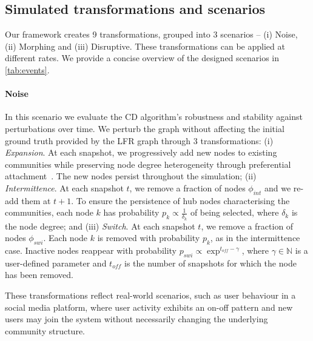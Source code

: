 \documentclass[letterpaper]{article}
\begin{document}
\subsection{Simulated transformations and scenarios}
\label{ss:scenarios}
Our framework creates 9 transformations, grouped into
 3 scenarios -- \ie (i) Noise, (ii) Morphing and (iii) Disruptive. These transformations can be applied at different rates. We provide a concise overview of the designed scenarios in \cref{tab:events}.

\paragraph*{Noise} In this scenario we evaluate the CD algorithm's robustness and stability against perturbations over time.
We perturb the graph without affecting the initial ground truth provided by the LFR graph through 3 transformations: (i) \emph{Expansion}. At each snapshot, we progressively add new nodes to existing communities while preserving node degree heterogeneity through preferential attachment~\cite{Baraba_si_1999}. The new nodes persist throughout the simulation; (ii) \emph{Intermittence}.
At each snapshot $t$, we remove a fraction of nodes $\phi_{int}$ and we re-add them at $t+1$. To ensure the persistence of hub nodes characterising the communities, each node $k$ has probability $p_{k} \propto \frac{1}{\delta_k}$ of being selected, where $\delta_k$ is the node degree; and (iii) \emph{Switch}. At each snapshot $t$, we remove a fraction of nodes $\phi_{swi}$. Each node $k$ is removed with probability $p_{k}$, as in the intermittence case. Inactive nodes reappear with probability $p_{swi} \propto \exp^{t_{off} -\gamma }$, where $\gamma \in \mathbb{N}$ is a user-defined parameter and $t_{off}$ is the number of snapshots for which the node has been removed.

These transformations reflect real-world scenarios, such as user behaviour in a social media platform, where user activity exhibits an on-off pattern and new users may join the system without necessarily changing the underlying community structure.
\end{document}
